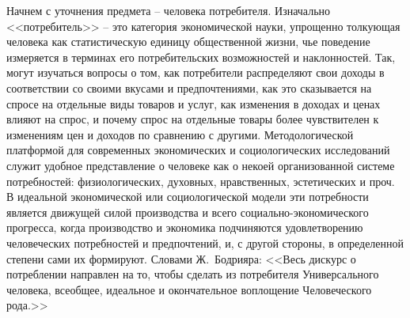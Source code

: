 Начнем с уточнения предмета -- человека потребителя. Изначально <<потребитель>> --
это категория экономической науки, упрощенно толкующая человека как
статистическую единицу общественной жизни, чье поведение измеряется в
терминах его потребительских возможностей и наклонностей. Так, могут изучаться
вопросы о том, как потребители распределяют свои доходы в соответствии со своими
вкусами и предпочтениями, как это сказывается на спросе на отдельные виды товаров
и услуг, как изменения в доходах и ценах влияют на спрос, и почему спрос на отдельные
товары более чувствителен к изменениям цен и доходов по сравнению с другими.
Методологической платформой для современных экономических и социологических
исследований служит удобное представление о человеке как о некоей организованной
системе потребностей: физиологических, духовных, нравственных, эстетических и проч.
В идеальной экономической или социологической модели эти потребности является
движущей силой производства и всего социально-экономического прогресса, когда
производство и экономика подчиняются удовлетворению человеческих потребностей
и предпочтений, и, с другой стороны, в определенной степени сами их формируют.
Словами Ж.~Бодрияра: <<Весь дискурс о потреблении направлен на то, чтобы сделать
из потребителя Универсального человека, всеобщее, идеальное и окончательное
воплощение Человеческого рода.>>\autocite{bodriyar_society}
\autocite{ballestrem1999}\autocite{book:bodriyar}\autocite{bunkina2000}\autocite{klein2003}
\autocite{kuli2000}\autocite{livshits2001}\autocite{markuze1994}\autocite{maslow2009}
\autocite{sibruk2005}\autocite{fukuyama2004}\autocite{alias2001}
